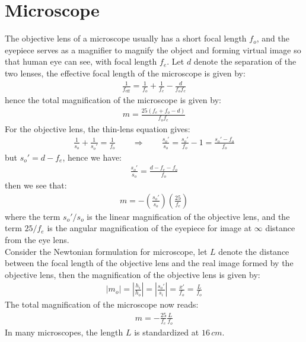 \documentclass[11pt]{book}
\theoremstyle{break}
\theoremstyle{break}
\begin{document}
\newpage
\section[Microscope]{\color{red} Microscope\color{black}}
The objective lens of a microscope usually has a short focal length $f_o$, and the eyepiece serves as a magnifier to magnify the object and forming virtual image so that human eye can see, with focal length $f_e$. Let $d$ denote the separation of the two lenses, the effective focal length of the microscope is given by:
\begin{align*}
\frac{1}{f_{\text{eff}}} = \frac{1}{f_o}+\frac{1}{f_e} - \frac{d}{f_of_e}
\end{align*}
hence the total magnification of the microscope is given by:
\begin{align*}
m = \frac{25(f_e + f_o - d)}{f_of_e}
\end{align*}
For the objective lens, the thin-lens equation gives:
\begin{align*}
\frac{1}{s_o} + \frac{1}{s_o'} = \frac{1}{f_o} \qquad \Rightarrow \qquad \frac{s_o'}{s_o} = \frac{s_o'}{f_o} - 1 = \frac{s_o'-f_o}{f_o}
\end{align*}
but $s_o' = d - f_e$, hence we have:
\begin{align*}
\frac{s_o'}{s_o} = \frac{d-f_e - f_o}{f_o}
\end{align*}
then we see that:
\begin{align*}
m = -\left( \frac{s_o'}{s_o}\right) \left( \frac{25}{f_e}\right)
\end{align*}
where the term $s_o'/s_o$ is the linear magnification of the objective lens, and the term $25/f_e$ is the angular magnification of the eyepiece for image at $\infty$ distance from the eye lens. \\

Consider the Newtonian formulation for microscope, let $L$ denote the distance between the focal length of the objective lens and the real image formed by the objective lens, then the magnification of the objective lens is given by:
\begin{align*}
|m_o| = \left| \frac{h_i}{h_o}\right| = \left| \frac{s_o'}{s_i}\right| = \frac{x'}{f_o} = \frac{L}{f_o}
\end{align*}
The total magnification of the microscope now reads:
\begin{align*}
 m =- \frac{25}{f_e} \frac{L}{f_o}
\end{align*}
In many microscopes, the length $L$ is standardized at $16\, cm$.\\
\end{document}
